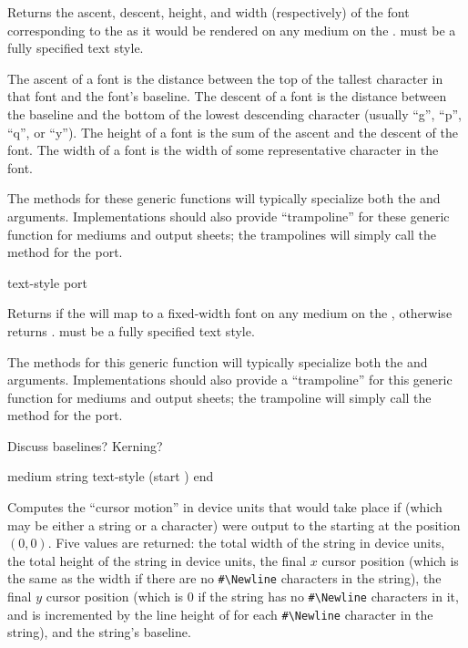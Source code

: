 Returns the ascent, descent, height, and width (respectively) of the font
corresponding to the   as it would be rendered
on any medium on the  .   must be a fully
specified text style.

The ascent of a font is the distance between the top of the tallest character in
that font and the font's baseline.  The descent of a font is the distance
between the baseline and the bottom of the lowest descending character (usually
``g'', ``p'', ``q'', or ``y'').  The height of a font is the sum of the ascent
and the descent of the font.  The width of a font is the width of some
representative character in the font.

The methods for these generic functions will typically specialize both the
 and  arguments.  Implementations should also provide
``trampoline'' for these generic function for mediums and output sheets; the
trampolines will simply call the method for the port.


 {text-style port}

Returns  if the   will map to a
fixed-width font on any medium on the  , otherwise returns
.   must be a fully specified text style.

The methods for this generic function will typically specialize both the
 and  arguments.  Implementations should also provide
a ``trampoline'' for this generic function for mediums and output sheets; the
trampoline will simply call the method for the port.


 {Discuss baselines?  Kerning?}


 {medium string \key text-style (start ) end} 

Computes the ``cursor motion'' in device units that would take place if
 (which may be either a string or a character) were output to the
  starting at the position $(0,0)$.  Five values are
returned:  the total width of the string in device units, the total height of
the string in device units, the final $x$ cursor position (which is the same as
the width if there are no \verb+#\Newline+ characters in the string), the final
$y$ cursor position (which is 0 if the string has no \verb+#\Newline+ characters
in it, and is incremented by the line height of  for each
\verb+#\Newline+ character in the string), and the string's baseline.

